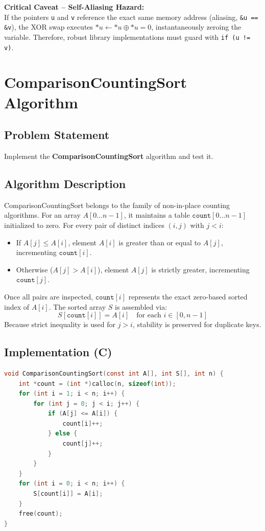 \documentclass[12pt,a4paper]{article}
\theoremstyle{plain}
\theoremstyle{definition}
\theoremstyle{remark}
\begin{document}
\begin{keybox}
  \textbf{\color{warningborder!80!black}Critical Caveat -- Self-Aliasing Hazard:} \\
  If the pointers \texttt{u} and \texttt{v} reference the exact same memory address (aliasing, \texttt{\&u == \&v}), the XOR swap executes $*u \leftarrow *u \oplus *u = 0$, instantaneously zeroing the variable. Therefore, robust library implementations must guard with \texttt{if (u != v)}.
\end{keybox}

\newpage
\section{ComparisonCountingSort Algorithm}

\subsection{Problem Statement}
Implement the \textbf{ComparisonCountingSort} algorithm and test it.

\subsection{Algorithm Description}
ComparisonCountingSort belongs to the family of non-in-place counting algorithms. For an array $A[0\dots n-1]$, it maintains a table $\texttt{count}[0\dots n-1]$ initialized to zero. For every pair of distinct indices $(i, j)$ with $j < i$:
\begin{itemize}
  \item If $A[j] \le A[i]$, element $A[i]$ is greater than or equal to $A[j]$, incrementing $\texttt{count}[i]$.
  \item Otherwise ($A[j] > A[i]$), element $A[j]$ is strictly greater, incrementing $\texttt{count}[j]$.
\end{itemize}
Once all pairs are inspected, $\texttt{count}[i]$ represents the exact zero-based sorted index of $A[i]$. The sorted array $S$ is assembled via:
\[
  S[\texttt{count}[i]] = A[i] \quad \text{for each } i \in [0, n-1]
\]
Because strict inequality is used for $j > i$, stability is preserved for duplicate keys.

\subsection{Implementation (C)}
\begin{lstlisting}[language=C, caption={comparison\_counting\_sort.c -- Levitin's formulation}]
void ComparisonCountingSort(const int A[], int S[], int n) {
    int *count = (int *)calloc(n, sizeof(int));
    for (int i = 1; i < n; i++) {
        for (int j = 0; j < i; j++) {
            if (A[j] <= A[i]) {
                count[i]++;
            } else {
                count[j]++;
            }
        }
    }
    for (int i = 0; i < n; i++) {
        S[count[i]] = A[i];
    }
    free(count);
}
\end{lstlisting}
\end{document}
